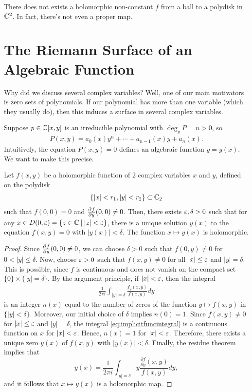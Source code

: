 \documentclass[11pt]{article}
\begin{document}
\begin{thm}
    There does not exists a holomorphic non-constant $f$ from a ball to a polydisk in $\mathbb{C}^2$. In fact, there's not even a proper map.
\end{thm}

\section{The Riemann Surface of an Algebraic Function}

Why did we discuss several complex variables? Well, one of our main motivators is zero sets of polynomials. If our polynomial has more than one variable (which they usually do), then this induces a surface in several complex variables.

Suppose $p\in \mathbb{C}[x,y]$ is an irreducible polynomial with $\deg_yP =n>0$, so 
\begin{align} \label{eq:P(x,y)}
    P(x,y)=a_0(x)y^n+\cdots + a_{n-1}(x)y+a_n(x).
\end{align}
Intuitively, the equation $P(x,y)=0$ defines an algebraic function $y=y(x)$. We want to make this precise.

\begin{thm}
    Let $f(x,y)$ be a holomorphic function of 2 complex variables $x$ and $y$, defined on the polydisk $$\left \{ |x|<r_1,|y|<r_2 \right \}\subset \mathbb{C}_2$$ such that $f(0,0)=0$ and $\frac{\partial^{}f}{\partial y^{}}(0,0)\neq 0$. Then, there exists $\varepsilon,\delta>0$ such that for any $x \in D(0,\varepsilon)=\left \{ z \in \mathbb{C} \: \middle |\: |z|<\varepsilon \right \}$, there is a unique solution $y(x)$ to the equation $f(x,y)=0$ with $|y(x)|<\delta$.  The function $x \mapsto y(x)$ is holomorphic.
\end{thm}

\begin{proof}
    Since $\frac{\partial^{}f}{\partial y^{}}(0,0)\neq 0$, we can choose $\delta>0$ such that $f(0,y)\neq 0$ for $0<|y| \le \delta$. Now, choose $\varepsilon>0$ such that $f(x,y)\neq 0$ for all $|x| \leq \varepsilon$ and $|y|=\delta$. This is possible, since $f$ is continuous and does not vanish on the compact set $\{0\} \times \{|y|=\delta\}$. By the argument principle, if $|x|<\varepsilon$, then the integral
    \begin{align} \label{eq:implicitfuncintegral}
        \frac{1}{2\pi i}\int_{|y|=\delta}\frac{f_y(x,y)}{f(x,y)}dy
    \end{align}
    is an integer $n(x)$ equal to the number of zeros of the function $y \mapsto f(x,y)$ in $\{|y|<\delta\}$. Moreover, our initial choice of $\delta$ implies $n(0)=1$. Since $f(x,y) \neq 0$ for $|x| \leq \varepsilon$ and $|y|=\delta$, the integral \eqref{eq:implicitfuncintegral} is a continuous function on $x$ for $|x|<\varepsilon$. Hence, $n(x)=1$ for $|x|<\varepsilon$. Therefore, there exists a unique zero $y(x)$ of $f(x,y)$ with $|y(x)|<\delta$. Finally, the residue theorem implies that 
    $$y(x) = \frac{1}{2\pi i}\int_{|y|=\delta}y\frac{ \frac{\partial f}{\partial y}(x,y) }{f(x,y)}dy,$$
    and it follows that $x \mapsto y(x)$ is a holomorphic map.
\end{proof}
\end{document}
